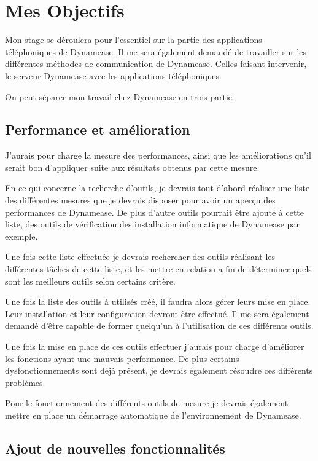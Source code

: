 \section{Mes Objectifs}

Mon stage se déroulera pour l'essentiel sur la partie des applications téléphoniques de Dynamease. Il me sera également demandé de travailler sur les différentes méthodes de communication de Dynamease. Celles faisant intervenir, le serveur Dynamease avec les applications téléphoniques.

On peut séparer mon travail chez Dynamease en trois partie 

\subsection{Performance et amélioration}

J'aurais pour charge la mesure des performances, ainsi que les améliorations qu'il serait bon d'appliquer suite aux résultats obtenus par cette mesure. 

En ce qui concerne la recherche d'outils, je devrais tout d'abord réaliser une liste des différentes mesures que je devrais disposer pour avoir un aperçu des performances de Dynamease. De plus d'autre outils pourrait être ajouté à cette liste, des outils de vérification des installation informatique de Dynamease par exemple.

Une fois cette liste effectuée je devrais rechercher des outils réalisant les différentes tâches de cette liste, et les mettre en relation a fin de déterminer quels sont les meilleurs outils selon certains critère.

Une fois la liste des outils à utilisés créé, il faudra alors gérer leurs mise en place. Leur installation et leur configuration devront être effectué. Il me sera également demandé d'être capable de former quelqu'un à l'utilisation de ces différents outils.

Une fois la mise en place de ces outils effectuer j'aurais pour charge d'améliorer les fonctions ayant une mauvais performance. De plus certains dysfonctionnements sont déjà présent, je devrais également résoudre ces différents problèmes.

Pour le fonctionnement des différents outils de mesure je devrais également mettre en place un démarrage automatique de l'environnement de Dynamease.

\subsection{Ajout de nouvelles fonctionnalités}

